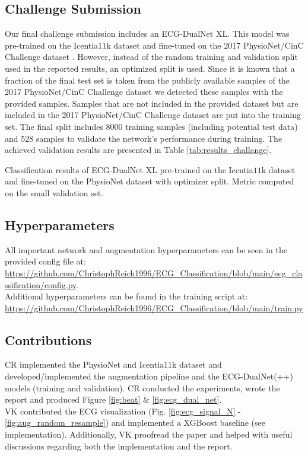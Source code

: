 \subsection{Challenge Submission} \label{subsec:challenge}

Our final challenge submission includes an ECG-DualNet XL. This model was pre-trained on the Icentia$11$k dataset \cite{Tan2019} and fine-tuned on the 2017 PhysioNet/CinC Challenge dataset \cite{Clifford2017}. However, instead of the random training and validation split used in the reported results, an optimized split is used. Since it is known that a fraction of the final test set is taken from the publicly available samples of the 2017 PhysioNet/CinC Challenge dataset we detected these samples with the provided samples. Samples that are not included in the provided dataset but are included in the 2017 PhysioNet/CinC Challenge dataset are put into the training set. The final split includes $8000$ training samples (including potential test data) and $528$ samples to validate the network's performance during training. The achieved validation results are presented in Table \ref{tab:results_challange}.

\begin{table}[!ht]
    \centering
    \caption{Classification results of ECG-DualNet XL pre-trained on the Icentia$11$k dataset and fine-tuned on the PhysioNet dataset with optimizer split. Metric computed on the small validation set.}
    
    \label{tab:results_challange}
\end{table}

\subsection{Hyperparameters}\label{subsec:hyperparameters}

All important network and augmentation hyperparameters can be seen in the provided config file at: \url{https://github.com/ChristophReich1996/ECG_Classification/blob/main/ecg_classification/config.py}.\\
Additional hyperparameters can be found in the training script at: \url{https://github.com/ChristophReich1996/ECG_Classification/blob/main/train.py}

\subsection{Contributions}
CR implemented the PhysioNet and Icentia$11$k dataset and developed/implemented the augmentation pipeline and the ECG-DualNet(++) models (training and validation). CR conducted the experiments, wrote the report and produced Figure \ref{fig:beat} \& \ref{fig:ecg_dual_net}.\\
VK contributed the ECG visualization (Fig. \ref{fig:ecg_signal_N} - \ref{fig:aug_random_resample}) and implemented a XGBoost baseline (see implementation). Additionally, VK proofread the paper and helped with useful discussions regarding both the implementation and the report.